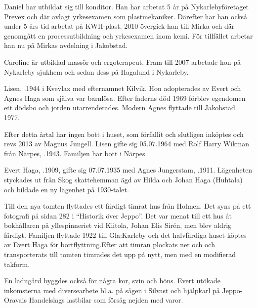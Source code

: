 Daniel har utbildat sig till konditor. Han har arbetat 5 år på Nykarlebyföretaget Prevex och där avlagt yrkesexamen som plastmekaniker. Därefter har han också under 5 års tid arbetat på KWH-plast. 2010 övergick han till Mirka  och där genomgått en processutbildning och yrkesexamen inom kemi. För tillfället arbetar han nu på Mirkas avdelning i Jakobstad.

Caroline är utbildad massör och ergoterapeut. Fram till 2007 arbetade hon på Nykarleby sjukhem och sedan dess på Hagalund i Nykarleby.

\begin{jhchildren}
  \item {}
  \item {}
\end{jhchildren}




Lisen, .1944 i Kvevlax med efternamnet Kilvik. Hon adopterades av Evert och Agnes Haga som själva var barnlösa. Efter faderns död 1969 förblev egendomen ett dödsbo och jorden utarrenderades. Modern Agnes flyttade till Jakobstad 1977.

Efter detta årtal har ingen bott i huset, som förfallit och slutligen inköptes och revs 2013 av Magnus Jungell. Lisen gifte sig 05.07.1964 med Rolf Harry Wikman från Närpes, .1943. Familjen har bott i Närpes.



Evert Haga, .1909, gifte sig 07.07.1935  med Agnes Jungerstam, .1911. Lägenheten styckades ut från Skog skattehemman ägd av Hilda och Johan Haga (Huhtala) och bildade en  ny lägenhet på 1930-talet.

Till den nya tomten flyttades ett färdigt timrat hus från Holmen. Det syns på ett fotografi på sidan 282 i ``Historik över Jeppo''. Det var menat till ett hus åt bokhållaren på yllespinneriet vid Kiitola, Johan Elis Sirén, men blev aldrig färdigt. Familjen flyttade 1922 till Gla:Karleby och det halvfärdiga huset köptes av Evert Haga för bortflyttning.Efter att timran plockats ner och och transporterats till tomten timrades det upp på nytt, men med en modifierad takform.

En ladugård byggdes också för några kor, svin och höns. Evert utökade inkomsterna med diversearbete bl.a. på sågen i Silvast och hjälpkarl på
Jeppo-Oravais Handelslags lastbilar som försåg nejden med varor.

